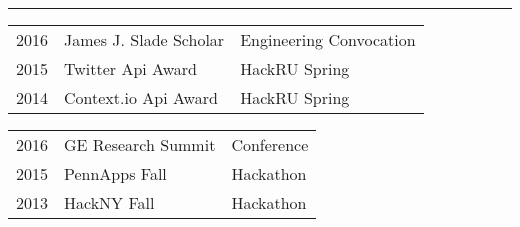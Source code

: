 \documentclass[letterpaper]{deedy-resume} %
\newcommand{\colorrule}[1]{%
\begingroup\color{#1}\hrule\endgroup%
}%
\begin{document}
\sectionspace

\hfill
{}
\vspace{1 mm}
\colorrule{black}
\normalfont
\vspace{2 mm}
\normalfont
\fontsize{10pt}{12pt}
\selectfont
\begin{minipage}[t]{0.66\textwidth}
\begin{tabular}{l|l|l}
2016 & James J. Slade Scholar & Engineering Convocation \\
2015 & Twitter Api Award & HackRU Spring \\
2014 & Context.io Api Award & HackRU Spring \\

\end{tabular}
\end{minipage}
\begin{minipage}[t]{0.33\textwidth}
\hfill	
\begin{tabular}{l|l|l}
2016 & GE Research Summit & Conference\\
2015 & PennApps Fall & Hackathon\\ 
2013 & HackNY Fall   & Hackathon\\
\end{tabular}    
\end{minipage}




\sectionspace %



\sectionspace %
\end{document}
